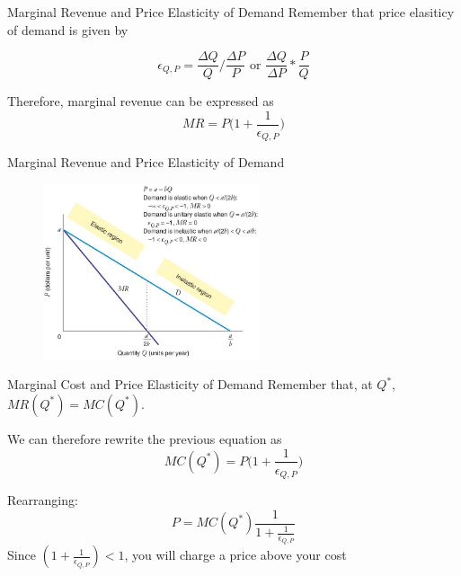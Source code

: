 \documentclass[11pt,t]{beamer}
\begin{document}
\begin{frame}{Marginal Revenue and Price Elasticity of Demand}
  Remember that price elasiticy of demand is given by

  \begin{equation}
    \epsilon_{Q,P}=\frac{\Delta Q}{Q} /\frac{\Delta P}{P}\text{ or } \frac{\Delta Q}{\Delta P}*\frac{P}{Q}
  \end{equation}

  \bigskip
  Therefore, marginal revenue can be expressed as
  $$
    MR=P\Big(1+\frac{1}{\epsilon_{Q,P}}\Big)
  $$
\end{frame}

\begin{frame}{Marginal Revenue and Price Elasticity of Demand}
  \begin{figure}
    \includegraphics[width=240px]{figures/fig11_8.jpg}
  \end{figure}
\end{frame}

\begin{frame}{Marginal Cost and Price Elasticity of Demand}
  Remember that, at $Q^*$, $MR(Q^*)=MC(Q^*)$.

  \bigskip
  We can therefore rewrite the previous equation as
  $$
    MC(Q^*)= P \Big( 1 + \frac{1}{\epsilon_{Q,P}} \Big)
  $$

  \pause\bigskip
  Rearranging: 
  $$
  P = MC(Q^*) \frac{1}{1 + \frac{1}{\epsilon_{Q,P}}}
  $$
  Since $(1 + \frac{1}{\epsilon_{Q,P}}) < 1$, you will charge a price above your cost
\end{frame}

\end{document}
